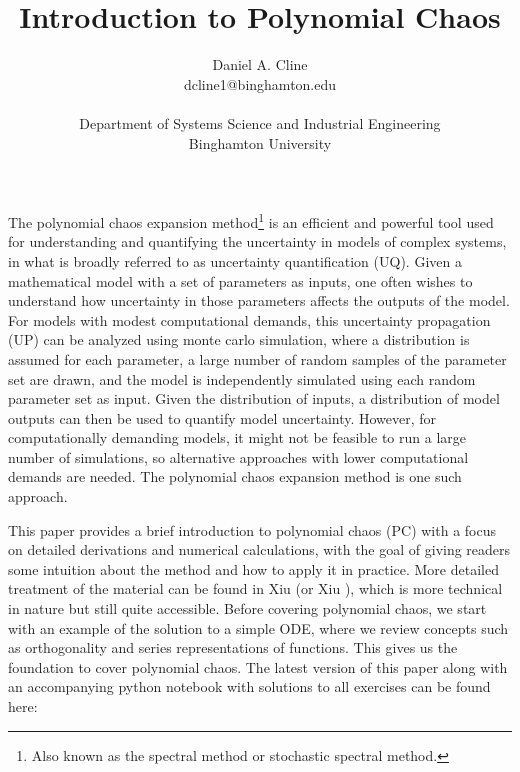 \documentclass[11pt]{article}
\numberwithin{equation}{section}
\newcommand{\titlebox}[6]{
   \vspace*{-2cm}
   \noindent
   \begin{center}
   \framebox{
      \vbox{\vspace{1mm}
       \hbox to 5.83in { {\em #2 \hfill #3 } }
       \vspace{4mm}
       \hbox to 5.83in { \hfill {\bf \Large  #1 }\hfill }
       \vspace{4mm}
       \hbox to 5.83in { {\em #4 \hfill #5 } }
      \vspace{1mm}}
   }
   \end{center}
   \vspace*{2mm}
}
\begin{document}

\title{\vspace*{-1cm}Introduction to Polynomial Chaos}
\author{Daniel A. Cline\\ dcline1@binghamton.edu\\ \\ Department of Systems Science and Industrial Engineering\\ Binghamton University}
\maketitle

The polynomial chaos expansion method\footnote{Also known as the spectral method or stochastic spectral method.} is an efficient and powerful tool used for understanding and quantifying the uncertainty in models of complex systems, in what is broadly referred to as uncertainty quantification (UQ). Given a mathematical model with a set of parameters as inputs, one often wishes to understand how uncertainty in those parameters affects the outputs of the model. For models with modest computational demands, this uncertainty propagation (UP) can be analyzed using monte carlo simulation, where a distribution is assumed for each parameter, a large number of random samples of the parameter set are drawn, and the model is independently simulated using each random parameter set as input. Given the distribution of inputs, a distribution of model outputs can then be used to quantify model uncertainty. However, for computationally demanding models, it might not be feasible to run a large number of simulations, so alternative approaches with lower computational demands are needed. The polynomial chaos expansion method is one such approach.

\qquad This paper provides a brief introduction to polynomial chaos (PC) with a focus on detailed derivations and numerical calculations, with the goal of giving readers some intuition about the method and how to apply it in practice. More detailed treatment of the material can be found in Xiu \cite{X10} (or Xiu \cite{X04}), which is more technical in nature but still quite accessible. Before covering polynomial chaos, we start with an example of the solution to a simple ODE, where we review concepts such as orthogonality and series representations of functions. This gives us the foundation to cover polynomial chaos. The latest version of this paper along with an accompanying python notebook with solutions to all exercises can be found here:
\end{document}

